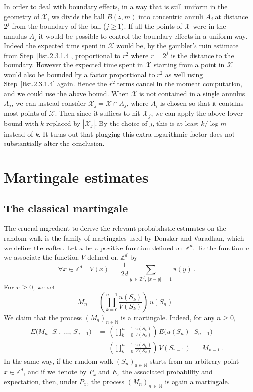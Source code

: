 \documentclass[AHL, Unicode, longabstracts, published]{cedram}
\newcommand*\Zd {{\mathbb Z^d}}
\newcommand*\N {{\mathbb N}}
\newcommand{\cX}{\mathcal{X}}
\renewcommand{\N}{\mathbb{N}}
\let\oldforall\forall
\renewcommand*{\forall}{\mathrel{\oldforall}}
\begin{document}
In order to deal with boundary effects, in a way that is still uniform in the geometry of $\cX$, we divide the ball $B(z, m)$ into concentric annuli $A_j$ at distance $2^j$ from the boundary of the ball ($j \ge 1$). If all the points of $\cX$ were in the annulus $A_j$ it would be possible to control the boundary effects in a uniform way. Indeed the expected time spent in $\cX$ would be, by the gambler's ruin estimate from Step~\eqref{list.2.3.1.4}, proportional to $r^2$ where $r = 2^j$ is the distance to the boundary. However the expected time spent in $\cX $ starting from a point in $\cX$ would also be bounded by a factor proportional to $r^2$ as well using Step~\eqref{list.2.3.1.4} again. Hence the $r^2$ terms cancel in the moment computation, and we could use the above bound. When $\cX$ is not contained in a single annulus $A_j$, we can instead consider $\cX_j = \cX \cap A_j$, where $A_j$ is chosen so that it contains most points of $\cX$. Then since it suffices to hit $\cX_j$, we can apply the above lower bound with $k$ replaced by $|\cX_j|$. By the choice of $j$, this is at least $k /\log m$ instead of $k$. It turns out that plugging this extra logarithmic factor does not substantially alter the conclusion.


\section{Martingale estimates}\label{S:DV}


\subsection{The classical martingale}\label{clama}
The crucial ingredient to derive the relevant probabilistic estimates on the random walk is the family of martingales used by Donsker and Varadhan, which we define thereafter. Let $u$ be a positive function defined on $\Zd$. To the function $u$ we associate the function $V$ defined on $\Zd$ by
\[
\forall x\in\Zd\quad V(x)\,=\,\frac{1}{2d}
\sum_{{y\,\in\,\Zd},\,{|x-y|\,=\,1}}u(y)\,.
\]
For $n\geq 0$, we set
\[
M_n\,=\,\left(
\prod_{k=0}^{n-1}\frac{u(S_k)}{V(S_k)}\right)\,u(S_n)\,.
\]
We claim that the process $(M_n)_{n\in\N}$ is a martingale. Indeed, for any $n\geq 0$,
\begin{align*}
E\big(M_n\,\big|\,S_0,\,\dots,\,S_{n-1}\big)\,&=\,
\left(\prod_{k=0}^{n-1}\frac{u(S_k)}{V(S_k)}\right)\, E\big(u(S_n)\,|\,S_{n-1}\big)\\
\,&=\,\left(\prod_{k=0}^{n-1}\frac{u(S_k)}{V(S_k)}\right)\, V(S_{n-1})\,=\,M_{n-1}\,.
\end{align*}
In the same way, if the random walk $(S_n)_{n\in\N}$ starts from an arbitrary point $x\in\Zd$, and if we denote by $P_x$ and $E_x$ the associated probability and expectation, then, under $P_x$, the process $(M_n)_{n\,\in\,\N}$ is again a martingale.
\end{document}
